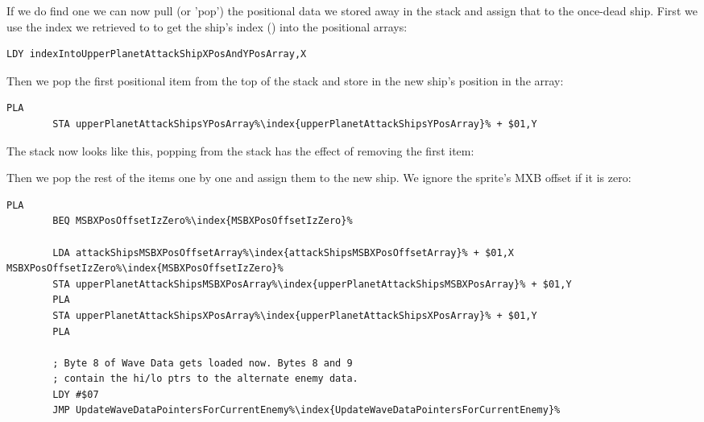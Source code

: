 If we do find one we can now pull (or 'pop') the positional data we stored away in the stack and assign that to the once-dead
ship. First we use the index we retrieved to  to get the ship's index () into the positional arrays:

\begin{lstlisting}[escapechar=\%]
        LDY indexIntoUpperPlanetAttackShipXPosAndYPosArray,X
\end{lstlisting}

Then we pop the first positional item  from the top of the stack and store in the new
ship's position in the array:

\begin{lstlisting}[caption="\icode{PLA} remove the top item from the stack and stores it in \icode{A},escapechar=\%]
        PLA
        STA upperPlanetAttackShipsYPosArray%\index{upperPlanetAttackShipsYPosArray}% + $01,Y
\end{lstlisting}

The stack now looks like this, popping from the stack has the effect of removing the first item:

\begin{figure}[H]
  {
    \setlength{\tabcolsep}{3.0pt}
    \setlength\cmidrulewidth{\heavyrulewidth} %
    \begin{adjustbox}{width=10cm,center}
    \end{adjustbox}

  }
\end{figure}

Then we pop the rest of the items one by one and assign them to the new ship. We ignore the sprite's MXB offset if it is
zero:
\begin{lstlisting}[caption=\icode{PLA} remove the top item from the stack and stores it in \icode{A}.,escapechar=\%]
        PLA
        BEQ MSBXPosOffsetIzZero%\index{MSBXPosOffsetIzZero}%

        LDA attackShipsMSBXPosOffsetArray%\index{attackShipsMSBXPosOffsetArray}% + $01,X
MSBXPosOffsetIzZero%\index{MSBXPosOffsetIzZero}%   
        STA upperPlanetAttackShipsMSBXPosArray%\index{upperPlanetAttackShipsMSBXPosArray}% + $01,Y
        PLA
        STA upperPlanetAttackShipsXPosArray%\index{upperPlanetAttackShipsXPosArray}% + $01,Y
        PLA

        ; Byte 8 of Wave Data gets loaded now. Bytes 8 and 9
        ; contain the hi/lo ptrs to the alternate enemy data.
        LDY #$07
        JMP UpdateWaveDataPointersForCurrentEnemy%\index{UpdateWaveDataPointersForCurrentEnemy}%
\end{lstlisting}

